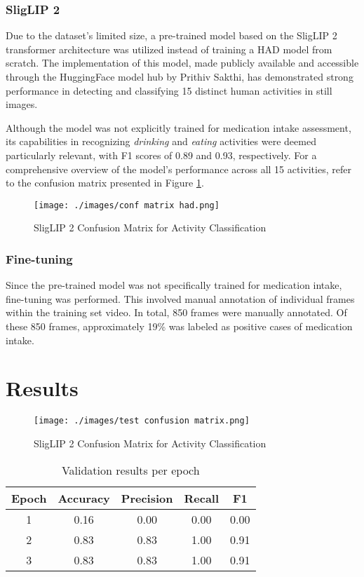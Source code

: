\documentclass[a4paper,12pt]{article}
\begin{document}
\subsubsection{SligLIP 2}
Due to the dataset's limited size, a pre-trained model based on the SligLIP 2
transformer architecture was utilized instead of training a HAD model from scratch.
The implementation of this model, made publicly available and accessible through the
HuggingFace model hub by Prithiv Sakthi, has demonstrated strong performance
in detecting and classifying 15 distinct human activities in still images.

Although the model was not explicitly trained for medication intake assessment, its
capabilities in recognizing \textit{drinking} and \textit{eating} activities were
deemed particularly relevant, with F1 scores of 0.89 and 0.93, respectively. For a
comprehensive overview of the model's performance across all 15 activities, refer to
the confusion matrix presented in Figure
\ref{fig:HAD-cm}.

\begin{figure}[H]
    \centering
    \texttt{[image: ./images/conf matrix had.png]} 
    \caption{SligLIP 2 Confusion Matrix for Activity Classification}
    \label{fig:HAD-cm}
\end{figure}

\subsubsection{Fine-tuning}
Since the pre-trained model was not specifically trained for medication intake, fine-tuning was performed. This 
involved manual annotation of individual frames within the training set video. In total, 850 frames  were manually
annotated. Of these 850  frames, approximately 19\% was labeled as positive cases of medication intake.


\section{Results}
\begin{figure}[H]
    \centering
    \texttt{[image: ./images/test confusion matrix.png]} %
    \caption{SligLIP 2 Confusion Matrix for Activity Classification}
    \label{fig:test-cm}
\end{figure}


\begin{table}[H]
    \centering
    \begin{tabular}{|c||c|c|c|c|}
        \hline
        Epoch & Accuracy & Precision & Recall & F1 \\
        \hline
        1 & 0.16 & 0.00 & 0.00 & 0.00 \\
        2 & 0.83 & 0.83 & 1.00 & 0.91 \\
        3 & 0.83 & 0.83 & 1.00 & 0.91 \\
        \hline
    \end{tabular}
    \caption{Validation results per epoch}
    \label{tab:val-results}
\end{table}
\end{document}
